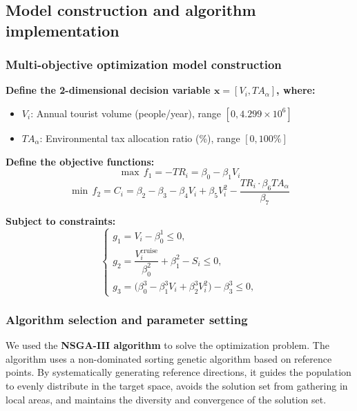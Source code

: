\documentclass{mcmthesis}
\begin{document}
\subsection{Model construction and algorithm implementation}
\subsubsection{Multi-objective optimization model construction}
\textbf{Define the 2-dimensional decision variable \( \mathbf{x} = [V_i, TA_{\alpha}] \), where:}
\begin{itemize}
    \item \( V_i \): Annual tourist volume (people/year), range \([0, 4.299 \times 10^6]\)
    \item \( TA_{\alpha} \): Environmental tax allocation ratio (\%), range \([0, 100\%]\)
\end{itemize}

\textbf{Define the objective functions:}
\[
\max \, f_1 = -TR_i = \beta_0 - \beta_1 V_i
\]
\[
\min \, f_2 = C_i = \beta_2 - \beta_3 - \beta_4 V_i + \beta_5 V_i^2 - \frac{TR_i \cdot \beta_6 TA_{\alpha}}{\beta_7}
\]

\textbf{Subject to constraints:}
\[
\begin{cases} 
    g_1 = V_i - \beta_0^1 \leq 0, \\ 
    g_2 = \dfrac{V_i^{\text{cruise}}}{\beta_0^2} + \beta_{1}^2 - S_i \leq 0, \\
    g_3 = \big( \beta_{0}^3 - \beta_{1}^3 V_i + \beta_{2}^3 V_i^2 \big) - \beta_{3}^3 \leq 0,
\end{cases}
\]
\subsubsection{Algorithm selection and parameter setting}
We used the \textbf{NSGA-III algorithm} to solve the optimization problem. The algorithm uses a non-dominated sorting genetic algorithm based on reference points. By systematically generating reference directions, it guides the population to evenly distribute in the target space, avoids the solution set from gathering in local areas, and maintains the diversity and convergence of 
the solution set. 

\end{document}
